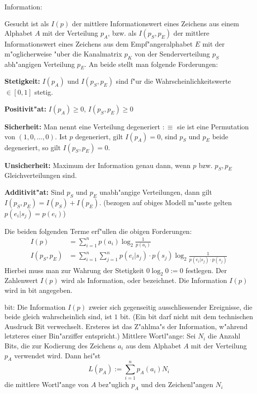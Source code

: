  Information:{
  Gesucht ist als $I(p)$ der mittlere Informationswert eines Zeichens aus einem
  Alphabet $A$ mit der Verteilung $p_A$, bzw. als $I(p_S,p_E)$ der mittlere 
  Informationswert eines Zeichens aus dem Empf"angeralphabet $E$ mit der 
  m"oglicherweise "uber die Kanalmatrix $p_K$ von der Senderverteilung $p_S$ 
  abh"angigen Verteilung $p_E$. An beide stellt man folgende Forderungen:
  \begin{stmts}
    \item \textbf{Stetigkeit:} $I(p_A)$ und $I(p_S,p_E)$ sind f"ur die 
      Wahrscheinlichkeitswerte $\in[0,1]$ stetig.
    \item \textbf{Positivit"at:} $I(p_A)\ge 0$, $I(p_S,p_E)\ge 0$
    \item \textbf{Sicherheit:} Man nennt eine Verteilung degeneriert 
      $:\equiv$ sie ist eine Permutation von $(1,0,\ldots,0)$.
      Ist $p$ degeneriert, gilt $I(p_A)=0$, sind $p_S$ und $p_E$ beide
      degeneriert, so gilt $I(p_S,p_E)=0$.
    \item \textbf{Unsicherheit:} Maximum der Information genau dann, wenn
      $p$ bzw. $p_S,p_E$ Gleichverteilungen sind.
    \item \textbf{Additivit"at:} Sind $p_S$ und $p_E$ unabh"angige 
      Verteilungen, dann gilt $I(p_S,p_E)=I(p_S)+I(p_E)$. (bezogen auf obiges
      Modell m"usste gelten $p(e_i|s_j)=p(e_i)$)
  \end{stmts}
  Die beiden folgenden Terme erf"ullen die obigen Forderungen:
  \begin{align*}
    I(p)&=\sum_{i=1}^n p(a_i) \log_2 \frac 1 {p(a_i)} \\
    I(p_S,p_E)&=\sum_{i=1}^n \sum_{j=1}^n p(e_i|s_j)\cdot p(s_j) 
      \log_2 \frac 1 {p(e_i|s_j)\cdot p(s_j) } 
  \end{align*}
  Hierbei muss man zur Wahrung der Stetigkeit $0 \log_2 0:=0$ festlegen.
  Der Zahlenwert $I(p)$ wird als Information,  oder
   bezeichnet. Die Information $I(p)$ wird in bit 
  angegeben.
}
 bit:{
  Die Information $I(p)$ zweier sich gegenseitig ausschliessender Ereignisse,
  die beide gleich wahrscheinlich sind, ist $1$ bit.
  (Ein bit darf nicht mit dem technischen Ausdruck Bit verwechselt. Ersteres
  ist das Z"ahlma"s der Information, w"ahrend letzteres einer Bin"arziffer
  entspricht.)
}
 Mittlere Wortl"ange:{
  Sei $N_i$ die Anzahl Bits, die zur Kodierung des Zeichens $a_i$ aus
  dem Alphabet $A$ mit der Verteilung $p_A$ verwendet wird. Dann hei"st
  \[
    L(p_A):=\sum_{i=1}^n p_A(a_i) N_i
  \]
  die mittlere Wortl"ange von $A$ bez"uglich $p_A$ und den Zeichenl"angen $N_i$
}
